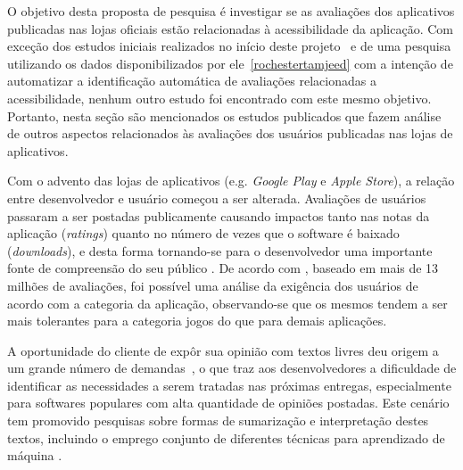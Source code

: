 O objetivo desta proposta de pesquisa é investigar se as avaliações dos aplicativos publicadas nas lojas oficiais estão relacionadas à acessibilidade da aplicação. Com exceção dos estudos iniciais realizados no início deste projeto~\cite{ihc2019} e de uma pesquisa utilizando os dados disponibilizados por ele~\ref{rochestertamjeed} com a intenção de automatizar a identificação automática de avaliações relacionadas a acessibilidade, nenhum outro estudo foi encontrado com este mesmo objetivo. 
Portanto, nesta seção são mencionados os estudos publicados que fazem análise de outros aspectos relacionados às avaliações dos usuários publicadas nas lojas de aplicativos. 


Com o advento das lojas de aplicativos (e.g. \textit{Google Play} e \textit{Apple Store}),
a relação entre desenvolvedor e usuário começou a ser alterada. Avaliações de usuários passaram a ser postadas publicamente causando impactos tanto nas notas da aplicação (\textit{ratings}) quanto no número de vezes que o software é baixado (\textit{downloads}), e desta forma tornando-se para o desenvolvedor uma importante fonte de compreensão do seu público \cite{Pagano2013userfeedback}. De acordo com \cite{Fu2013whypeoplehate}, baseado em mais de 13 milhões de avaliações, foi possível uma análise da exigência dos usuários de acordo com a categoria da aplicação, observando-se que os mesmos tendem a ser mais tolerantes para a categoria jogos do que para demais aplicações.

A oportunidade do cliente de expôr sua opinião com textos livres deu origem a um grande número de demandas~\cite{Mcilroy2016analyzing}, o que traz aos desenvolvedores a dificuldade de identificar as necessidades a serem tratadas nas próximas entregas, especialmente para softwares populares com alta quantidade de opiniões postadas. Este cenário tem promovido pesquisas sobre formas de sumarização \cite{Iacob2013retrieving,Iacob2014online,Fu2013whypeoplehate} e interpretação destes textos, incluindo o emprego conjunto de diferentes técnicas para aprendizado de máquina \cite{Panichella2015how}.

